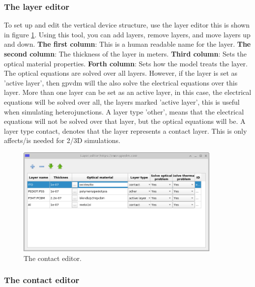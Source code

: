 \documentclass[11pt]{article}
\begin{document}
\subsubsection{The layer editor}
To set up and edit the vertical device structure, use the layer editor this is shown in figure \ref{fig:layer_editor}. Using this tool, you can add layers, remove layers, and move layers up and down.
\linebreak
\linebreak 
\textbf{The first column}: This is a human readable name for the layer.
\linebreak 
\linebreak 
\textbf{The second column}: The thickness of the layer in meters.
\linebreak
\linebreak 
\textbf{Third column}: Sets the optical material properties.
\linebreak
\linebreak 
\textbf{Forth column}: Sets how the model treats the layer.  The optical equations are solved over all layers.  However, if the layer is set as 'active layer', then gpvdm will the also solve the electrical equations over this layer.  More than one layer can be set as an active layer, in this case, the electrical equations will be solved over all, the layers marked 'active layer', this is useful when simulating heterojunctions.  A layer type 'other', means that the electrical equations will not be solved over that layer, but the optical equations will be.  A layer type contact, denotes that the layer represents a contact layer.  This is only affects/is needed for 2/3D simulations.


\begin{figure}[ht!]
\centering
\includegraphics[width=100mm]{./images/layer_editor.png}
{\caption{The contact editor.}}
\label{fig:layer_editor}
\end{figure}

\subsubsection{The contact editor}
\end{document}

